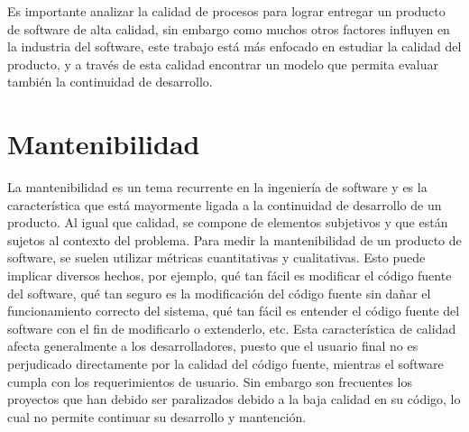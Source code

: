 Es importante analizar la calidad de procesos para lograr entregar un producto
de software de alta calidad, sin embargo como muchos otros factores influyen
en la industria del software, este trabajo está más enfocado en estudiar
la calidad del producto, y a través de esta calidad encontrar un modelo que
permita evaluar también la continuidad de desarrollo.

\section{Mantenibilidad}

La mantenibilidad es un tema recurrente en la ingeniería de software y es la característica que
está mayormente ligada a la continuidad de desarrollo de un producto.
Al igual que calidad, se compone de elementos subjetivos y que están sujetos
al contexto del problema. Para medir la mantenibilidad de un producto de
software, se suelen utilizar métricas cuantitativas y cualitativas.
Esto puede implicar diversos hechos, por ejemplo, qué tan fácil es modificar
el código fuente del software, qué tan seguro es la modificación del código
fuente sin dañar el funcionamiento correcto del sistema, qué tan fácil es entender el código
fuente del software con el fin de modificarlo o extenderlo, etc.
Esta característica de calidad afecta generalmente a los desarrolladores,
puesto que el usuario final no es perjudicado directamente por la calidad
del código fuente, mientras el software cumpla con los requerimientos de usuario.
Sin embargo son frecuentes los proyectos que han debido ser paralizados
debido a la baja calidad en su código, lo cual no permite continuar su desarrollo y mantención.
